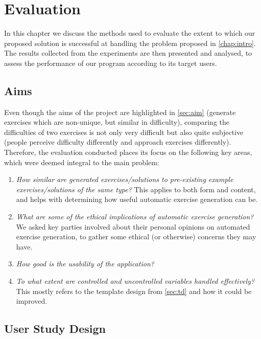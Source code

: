 \documentclass{l4proj}
\begin{document}
\chapter{Evaluation} 
\label{chap:ev}

In this chapter we discuss the methods used to evaluate the extent to which our proposed solution is successful at handling the problem proposed in \autoref{chap:intro}. The results collected from the experiments are then presented and analysed, to assess the performance of our program according to its target users.

\section{Aims}
\label{sec:evalAims}

Even though the aims of the project are highlighted in \autoref{sec:aim} (generate exercises which are non-unique, but similar in difficulty), comparing the difficulties of two exercises is not only very difficult but also quite subjective (people perceive difficulty differently and approach exercises differently). Therefore, the evaluation conducted places its focus on the following key areas, which were deemed integral to the main problem:

\begin{enumerate}
	\item
	\emph{How similar are generated exercises/solutions to pre-existing example exercises/solutions of the same type?} This applies to both form and content, and helps with determining how useful automatic exercise generation can be.
	\item
	\emph{What are some of the ethical implications of automatic exercise generation?} We asked key parties involved about their personal opinions on automated exercise generation, to gather some ethical (or otherwise) concerns they may have.
	\item
	\emph{How good is the usability of the application?} 
	\item
	\emph{To what extent are controlled and uncontrolled variables handled effectively?} This mostly refers to the template design from \autoref{sec:td} and how it could be improved.
\end{enumerate}

\section{User Study Design}
\label{sec:exp_design}
\end{document}
